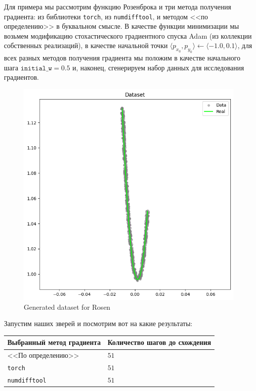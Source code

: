 \documentclass[12pt, a4paper, oneside, final]{article}
\begin{document}
	Для примера мы рассмотрим функцию Розенброка и три метода получения градиента: из библиотеки \texttt{torch}, из \texttt{numdifftool}, и методом <<по определению>> в буквальном смысле.
	В качестве функции минимизации мы возьмем модификацию стохастического градиентного спуска Adam (из коллекции собственных реализаций), в качестве начальной точки $\langle p_{x_0}, p_{y_0} \rangle \gets \langle -1.0, 0.1 \rangle$, для всех разных методов получения градиента мы положим в качестве начального шага $\mathtt{initial\_w} = 0.5$ и, наконец, сгенерируем набор данных для исследования градиентов.
	\begin{figure}[H]
		\centering
		\includegraphics[scale = 0.65]{Image/T2B_DATASET.png}
		\caption*{Generated dataset for Rosen}
	\end{figure}
	Запустим наших зверей и посмотрим вот на какие результаты:
	\begin{table}[H]
		\centering
		\begin{tabular}{l|l}
			Выбранный метод градиента & Количество шагов до схождения \\ \hline
			<<По определению>>        & $51$ \\
			\texttt{torch}            & $51$ \\
			\texttt{numdifftool}      & $51$
		\end{tabular}
	\end{table}
\end{document}
